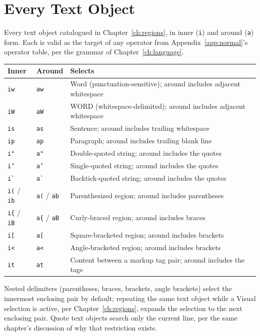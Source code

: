 \chapter{Every Text Object}
\label{app:textobjects}

Every text object catalogued in Chapter~\ref{ch:regions}, in inner (\texttt{i}) and around (\texttt{a}) form. Each is valid as the target of any operator from Appendix~\ref{app:normal}'s operator table, per the grammar of Chapter~\ref{ch:language}.

\begin{longtable}{@{}l l p{7.5cm}@{}}
\textbf{Inner} & \textbf{Around} & \textbf{Selects} \\
\hline
\endhead
\texttt{iw} & \texttt{aw} & Word (punctuation-sensitive); around includes adjacent whitespace \\
\texttt{iW} & \texttt{aW} & WORD (whitespace-delimited); around includes adjacent whitespace \\
\texttt{is} & \texttt{as} & Sentence; around includes trailing whitespace \\
\texttt{ip} & \texttt{ap} & Paragraph; around includes trailing blank line \\
\texttt{i"} & \texttt{a"} & Double-quoted string; around includes the quotes \\
\texttt{i'} & \texttt{a'} & Single-quoted string; around includes the quotes \\
\texttt{i\`{}} & \texttt{a\`{}} & Backtick-quoted string; around includes the quotes \\
\texttt{i(} / \texttt{ib} & \texttt{a(} / \texttt{ab} & Parenthesized region; around includes parentheses \\
\texttt{i\{} / \texttt{iB} & \texttt{a\{} / \texttt{aB} & Curly-braced region; around includes braces \\
\texttt{i[} & \texttt{a[} & Square-bracketed region; around includes brackets \\
\texttt{i<} & \texttt{a<} & Angle-bracketed region; around includes brackets \\
\texttt{it} & \texttt{at} & Content between a markup tag pair; around includes the tags \\
\end{longtable}

Nested delimiters (parentheses, braces, brackets, angle brackets) select the innermost enclosing pair by default; repeating the same text object while a Visual selection is active, per Chapter~\ref{ch:regions}, expands the selection to the next enclosing pair. Quote text objects search only the current line, per the same chapter's discussion of why that restriction exists.
